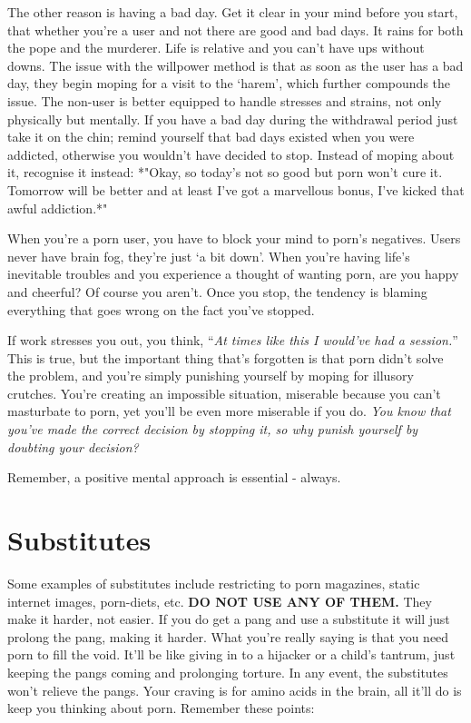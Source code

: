 \documentclass[
]{book}
\begin{document}
The other reason is having a bad day. Get it clear in your mind before you start, that whether you're a user and not there are good and bad days. It rains for both the pope and the murderer. Life is relative and you can't have ups without downs. The issue with the willpower method is that as soon as the user has a bad day, they begin moping for a visit to the `harem', which further compounds the issue. The non-user is better equipped to handle stresses and strains, not only physically but mentally. If you have a bad day during the withdrawal period just take it on the chin; remind yourself that bad days existed when you were addicted, otherwise you wouldn't have decided to stop. Instead of moping about it, recognise it instead: *"Okay, so today's not so good but porn won't cure it. Tomorrow will be better and at least I've got a marvellous bonus, I've kicked that awful addiction.*"

When you're a porn user, you have to block your mind to porn's negatives. Users never have brain fog, they're just `a bit down'. When you're having life's inevitable troubles and you experience a thought of wanting porn, are you happy and cheerful? Of course you aren't. Once you stop, the tendency is blaming everything that goes wrong on the fact you've stopped.

If work stresses you out, you think, ``\emph{At times like this I would've had a session.}'' This is true, but the important thing that's forgotten is that porn didn't solve the problem, and you're simply punishing yourself by moping for illusory crutches. You're creating an impossible situation, miserable because you can't masturbate to porn, yet you'll be even more miserable if you do. \emph{You know that you've made the correct decision by stopping it, so why punish yourself by doubting your decision?}

Remember, a positive mental approach is essential - always.

\hypertarget{substitutes}{%
\chapter{Substitutes}\label{substitutes}}

Some examples of substitutes include restricting to porn magazines, static internet images, porn-diets, etc. \textbf{DO NOT USE ANY OF THEM.} They make it harder, not easier. If you do get a pang and use a substitute it will just prolong the pang, making it harder. What you're really saying is that you need porn to fill the void. It'll be like giving in to a hijacker or a child's tantrum, just keeping the pangs coming and prolonging torture. In any event, the substitutes won't relieve the pangs. Your craving is for amino acids in the brain, all it'll do is keep you thinking about porn. Remember these points:
\end{document}
